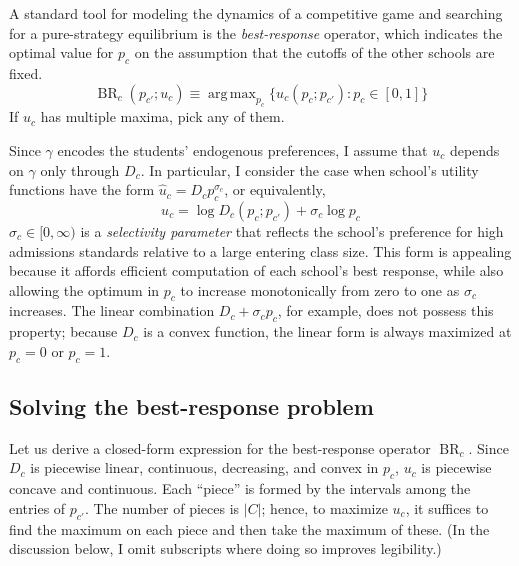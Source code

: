 \documentclass[12pt]{article}
\numberwithin{equation}{subsection}
\theoremstyle{definition}
\DeclareMathOperator*{\argmax}{arg\,max}
\begin{document}
A standard tool for modeling the dynamics of a competitive game and searching for a pure-strategy equilibrium is the \emph{best-response} operator, which indicates the optimal value for $p_c$ on the assumption that the cutoffs of the other schools are fixed.
\begin{equation}\operatorname{BR}_c  (p_{c'} ; u_c) \equiv \argmax_{p_c}\bigl\{ u_c(p_c; p_{c'}): p_c \in [0,1] \bigr\}\end{equation}
If $u_c$ has multiple maxima, pick any of them. 

Since $\gamma$ encodes the students' endogenous preferences, I assume that $u_c$ depends on $\gamma$ only through $D_c$. In particular, I consider the case when school's utility functions have the form $\hat u_c = D_c p_c^{\sigma_c}$, or equivalently,
\begin{equation} u_c = \log D_c(p_c; p_{c'})  + \sigma_c \log p_c \end{equation}
$\sigma_c \in [0, \infty)$ is a \emph{selectivity parameter} that reflects the school's preference for high admissions standards relative to a large entering class size. This form is appealing because it affords efficient computation of each school's best response, while also allowing the optimum in $p_c$ to increase monotonically from zero to one as $\sigma_c$ increases. The linear combination $D_c + \sigma_c p_c$, for example, does not possess this property; because $D_c$ is a convex function, the linear form is always maximized at $p_c = 0$ or $p_c =1$.

\subsection{Solving the best-response problem}
Let us derive a closed-form expression for the best-response operator $\operatorname{BR}_c$. Since $D_c$ is piecewise linear, continuous, decreasing, and convex in $p_c$, $u_c$ is piecewise concave and continuous. Each ``piece'' is formed by the intervals among the entries of $p_{c'}$. The number of pieces is $|C|$; hence, to maximize $u_c$, it suffices to find the maximum on each piece and then take the maximum of these. (In the discussion below, I omit subscripts where doing so improves legibility.)
\end{document}
